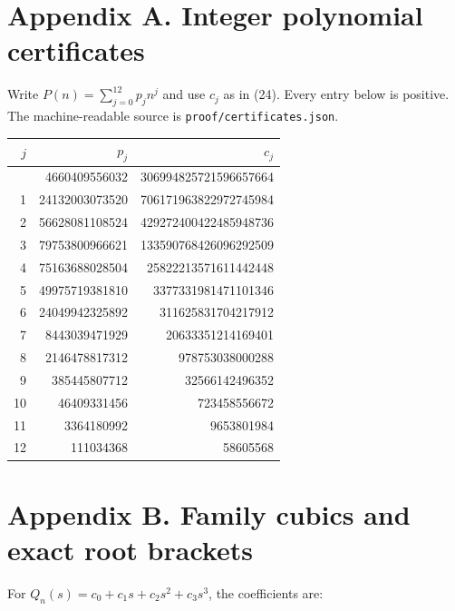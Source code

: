 \documentclass[
  11pt,
  a4paper,
]{article}
\begin{document}
\section{Appendix A. Integer polynomial
certificates}\label{appendix-a.-integer-polynomial-certificates}

Write \(P(n)=\sum_{j=0}^{12}p_jn^j\) and use \(c_j\) as in (24). Every
entry below is positive. The machine-readable source is
\texttt{proof/certificates.json}.

\begin{longtable}[]{@{}rrr@{}}
\toprule\noalign{}
\(j\) & \(p_j\) & \(c_j\) \\
\midrule\noalign{}
\endhead
\bottomrule\noalign{}
\endlastfoot
0 & 4660409556032 & 306994825721596657664 \\
1 & 24132003073520 & 706171963822972745984 \\
2 & 56628081108524 & 429272400422485948736 \\
3 & 79753800966621 & 133590768426096292509 \\
4 & 75163688028504 & 25822213571611442448 \\
5 & 49975719381810 & 3377331981471101346 \\
6 & 24049942325892 & 311625831704217912 \\
7 & 8443039471929 & 20633351214169401 \\
8 & 2146478817312 & 978753038000288 \\
9 & 385445807712 & 32566142496352 \\
10 & 46409331456 & 723458556672 \\
11 & 3364180992 & 9653801984 \\
12 & 111034368 & 58605568 \\
\end{longtable}

\section{Appendix B. Family cubics and exact root
brackets}\label{appendix-b.-family-cubics-and-exact-root-brackets}

For \(Q_n(s)=c_0+c_1s+c_2s^2+c_3s^3\), the coefficients are:
\end{document}
